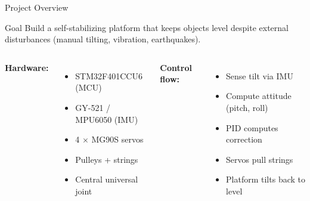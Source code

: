 \documentclass[10pt]{beamer}
\begin{document}
\begin{frame}{Project Overview}
  \begin{block}{Goal}
    Build a self-stabilizing platform that keeps objects level despite external disturbances (manual tilting, vibration, earthquakes).
  \end{block}

  \begin{columns}[T,onlytextwidth]
    \textbf{Hardware:}
    \begin{itemize}
      \item STM32F401CCU6 (MCU)
      \item GY-521 / MPU6050 (IMU)
      \item 4 $\times$ MG90S servos
      \item Pulleys + strings
      \item Central universal joint
    \end{itemize}

    \textbf{Control flow:}
    \begin{itemize}
      \item Sense tilt via IMU
      \item Compute attitude (pitch, roll)
      \item PID computes correction
      \item Servos pull strings
      \item Platform tilts back to level
    \end{itemize}
  \end{columns}
\end{frame}
\end{document}
